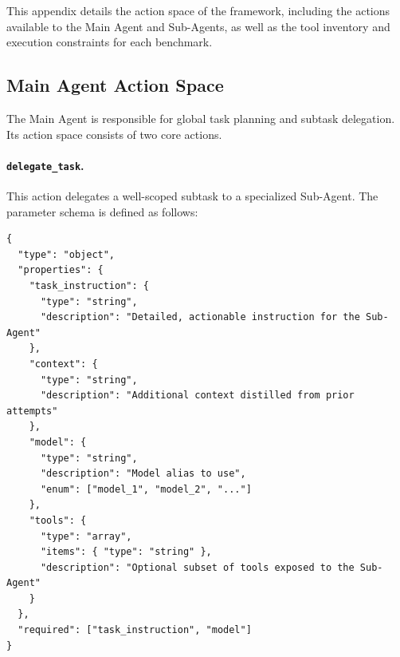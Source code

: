 
This appendix details the action space of the \our{} framework, including the actions available to the Main Agent and Sub-Agents, as well as the tool inventory and execution constraints for each benchmark.

\subsection{Main Agent Action Space}

The Main Agent is responsible for global task planning and subtask delegation. Its action space consists of two core actions.

\paragraph{\texttt{delegate\_task}.}
This action delegates a well-scoped subtask to a specialized Sub-Agent. The parameter schema is defined as follows:

\begin{tcolorbox}[title={\textbf{\small Action Schema: delegate\_task}},
  boxrule=1pt, arc=0mm,
  colback=gray!5,
  colframe=gray!70,
  breakable, before skip=6pt, after skip=10pt,
  pad at break=2mm, parbox=false]
\begin{verbatim}
{
  "type": "object",
  "properties": {
    "task_instruction": {
      "type": "string",
      "description": "Detailed, actionable instruction for the Sub-Agent"
    },
    "context": {
      "type": "string",
      "description": "Additional context distilled from prior attempts"
    },
    "model": {
      "type": "string",
      "description": "Model alias to use",
      "enum": ["model_1", "model_2", "..."]
    },
    "tools": {
      "type": "array",
      "items": { "type": "string" },
      "description": "Optional subset of tools exposed to the Sub-Agent"
    }
  },
  "required": ["task_instruction", "model"]
}
\end{verbatim}
\end{tcolorbox}

